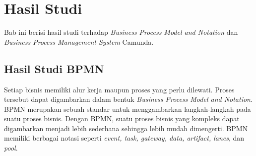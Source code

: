 \chapter{Hasil Studi}
\label{chap:hasilstudi}
Bab ini berisi hasil studi terhadap \textit{Business Process Model and Notation} dan \textit{Business Process Management System} Camunda. 

\section{Hasil Studi BPMN}
\label{sec:hasilstudi_bpmn}
Setiap bisnis memiliki alur kerja maupun proses yang perlu dilewati. Proses tersebut dapat digambarkan dalam bentuk \textit{Business Process Model and Notation}. BPMN merupakan sebuah standar untuk menggambarkan langkah-langkah pada suatu proses bisnis. Dengan BPMN, suatu proses bisnis yang kompleks dapat digambarkan menjadi lebih sederhana sehingga lebih mudah dimengerti. BPMN memiliki berbagai notasi seperti \textit{event, task, gateway, data, artifact, lanes}, dan \textit{pool}.  

	
